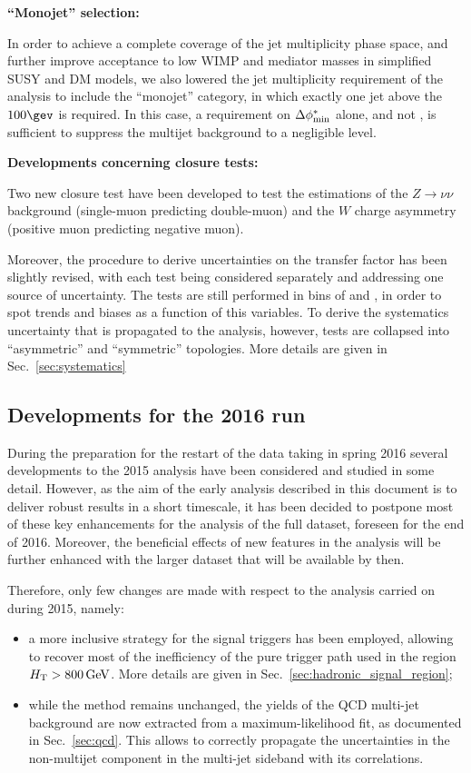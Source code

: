 {\bf ``Monojet'' selection:}

In order to achieve a complete coverage of the jet multiplicity phase space,
and further improve acceptance to low WIMP and mediator masses
in simplified SUSY and DM models, we also lowered the jet multiplicity 
requirement of the analysis to include the ``monojet'' category, in which
exactly one jet above the $100\gev$ is required. In this case, a requirement on
$\mbox{$\Delta\phi^{*}_{\rm min}$}$ alone, and not \alphat, is sufficient to suppress the multijet
background to a negligible level.


{\bf Developments concerning closure tests:}

Two new closure test have been developed to test the estimations of the $Z \to \nu \nu$
background (single-muon predicting double-muon) and the $W$ charge asymmetry (positive muon predicting negative muon). 

Moreover, the procedure to derive uncertainties on the transfer factor has been slightly revised, 
with each test being considered separately and addressing one source of uncertainty. 
The tests are still performed in bins of \nj and \scalht, 
in order to spot trends and biases as a function of this variables. 
To derive the systematics uncertainty that is propagated to the analysis, however, 
tests are collapsed into ``asymmetric'' and ``symmetric'' topologies. 
More details are given in Sec.~\ref{sec:systematics}


\subsection{Developments for the 2016 run \label{sec:devs_2016}}
During the preparation for the restart of the data taking in spring 2016 
several developments to the 2015 analysis have been considered and studied in some detail. 
However, as the aim of the early analysis described in this document is to deliver 
robust results in a short timescale, it has been decided to postpone most of these key enhancements 
for the analysis of the full dataset, foreseen for the end of 2016. 
Moreover, the beneficial effects of new features in the analysis will be further enhanced 
with the larger dataset that will be available by then. 

Therefore, only few changes are made with respect to the analysis carried on during 2015, namely:
\begin{itemize}
\item a more inclusive strategy for the signal triggers has been employed, allowing to recover most of the inefficiency 
of the pure \scalht trigger path used in the region $\mbox{$H_\text{T}$} > 800 \,\mathrm{GeV}$. More details are given in Sec.~\ref{sec:hadronic_signal_region};
\item while the method remains unchanged, the yields of the QCD multi-jet background are now extracted from a maximum-likelihood fit, as documented in Sec.~\ref{sec:qcd}. 
This allows to correctly propagate the uncertainties in the non-multijet component in the multi-jet sideband with its correlations. 
\end{itemize}

